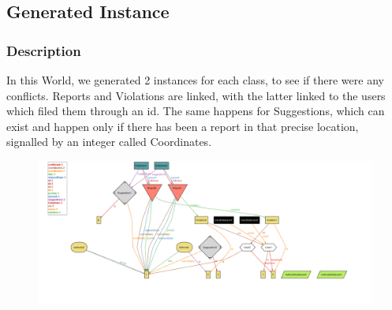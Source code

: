 \documentclass[12pt,a4paper]{article}
\begin{document}
\subsection{Generated Instance}
\subsubsection{Description}
In this World, we generated 2 instances for each class, to see if there were any conflicts. Reports and Violations are linked, with the latter linked to the users which filed them through an id. The same happens for Suggestions, which can exist and happen only if there has been a report in that precise location, signalled by an integer called Coordinates.
\begin{figure}[H]
				\centering
				\includegraphics[width=1.3\linewidth]{../assets/images/exports/user/Instance.png}
				\label{fig:GenWorld}
			\end{figure}
\newpage
\end{document}
